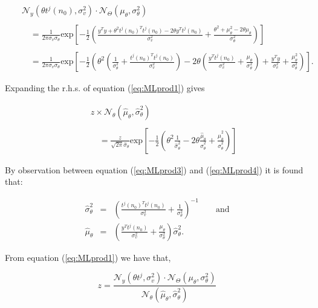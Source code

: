 \begin{eqnarray}\label{eq:MLprod3}
& & \mathcal{N}_y(\theta t^j(n_0),\sigma_v^2)\cdot\mathcal{N}_\Theta(\mu_\theta,\sigma^2_\theta) \\\nonumber{}\\\nonumber
& & \quad = \frac{1}{2\pi \sigma_v \sigma_\theta} \textrm{exp}\left[-\frac{1}{2}\left(\frac{y^Ty +\theta^2t^j(n_0)^Tt^j(n_0)-2\theta y^T t^j(n_0)}{\sigma^2_v}+\frac{\theta^2 + \mu^2_\theta-2\theta\mu_\theta}{\sigma_\theta^2}\right)\right]\\\nonumber{}\\\nonumber
& & \quad = \frac{1}{2\pi \sigma_v \sigma_\theta} \textrm{exp}\left[-\frac{1}{2}\left(\theta^2 \left(\frac{1}{\sigma_\theta^2}+\frac{t^j(n_0)^T t^j(n_0)}{\sigma_v^2}\right) - 2\theta\left(\frac{y^T t^j(n_0)}{\sigma_v^2}+\frac{\mu_\theta}{\sigma_\theta^2}\right) + \frac{y^Ty}{\sigma_v^2} +\frac{\mu_\theta^2}{\sigma_\theta^2}\right)\right].
\end{eqnarray}

Expanding the r.h.s. of equation (\ref{eq:MLprod1}) gives

\begin{eqnarray}\label{eq:MLprod4}
& & z \times \mathcal{N}_\theta(\hat{\mu}_\theta,\hat{\sigma}^2_\theta) \\\nonumber{}\\\nonumber
& & \quad = \frac{z}{\sqrt{2 \pi}\hat{\sigma}_\theta}\textrm{exp}\left[-\frac{1}{2}\left(\theta^2\frac{1}{\hat{\sigma}^2_\theta} - 2\theta\frac{\hat{\mu}_\theta}{\hat{\sigma}^2_\theta} + \frac{\hat{\mu}_\theta^2}{\hat{\sigma}^2_\theta}  \right)\right]
\end{eqnarray}

By observation between equation (\ref{eq:MLprod3}) and (\ref{eq:MLprod4}) it is found that:

\begin{eqnarray}
\label{eq:MLprod5}
\hat{\sigma}^2_\theta &=& \left(\frac{t^j(n_0)^T t^j(n_0)}{\sigma_v^2} + \frac{1}{\sigma_\theta^2}\right)^{-1} \qquad \textrm{and}\\\nonumber
\hat{\mu}_\theta &=& \left(\frac{y^T t^j(n_0)}{\sigma_v^2} + \frac{\mu_\theta}{\sigma^2_\theta}\right)\hat{\sigma}^2_\theta.
\end{eqnarray}

From equation (\ref{eq:MLprod1}) we have that,

\begin{equation}\label{eq:MLprod2}
z = \frac{\mathcal{N}_y(\theta t^j,\sigma_v^2)\cdot\mathcal{N}_\Theta(\mu_\theta,\sigma^2_\theta)}{\mathcal{N}_\theta(\hat{\mu}_\theta,\hat{\sigma}^2_\theta)}
\end{equation}


